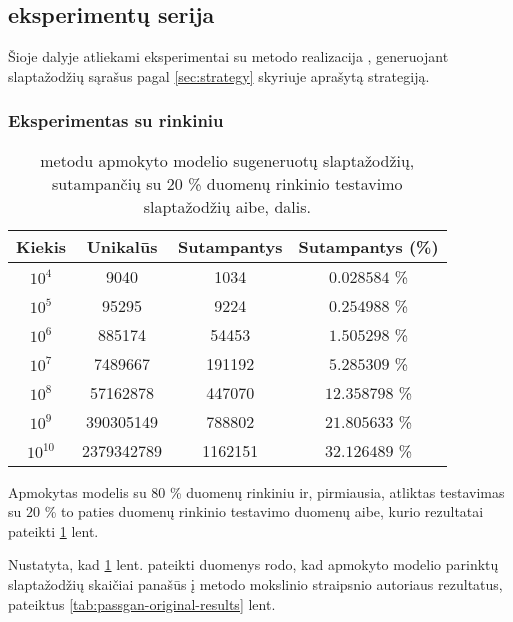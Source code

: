 \documentclass{VUMIFInfBakalaurinis}
\begin{document}
\subsection{ eksperimentų serija}
Šioje dalyje atliekami eksperimentai su  metodo realizacija 
\cite{PassGAN:impl}, generuojant slaptažodžių sąrašus pagal \ref{sec:strategy} 
skyriuje aprašytą strategiją.

\subsubsection{Eksperimentas su  rinkiniu} %
\label{sec:pgrockyou}
\begin{table}[hb]
  \centering
  \caption{%
     metodu apmokyto modelio sugeneruotų slaptažodžių, 
    sutampančių su $20$ \%  duomenų rinkinio testavimo
    slaptažodžių aibe, dalis.
  }
  \begin{tabular}{|c|c|c|c|}
    \hline \textbf{Kiekis} & \textbf{Unikalūs} & \textbf{Sutampantys} & 
    \textbf{Sutampantys (\%)} \\
    \hline $10^4$ & 9040 & 1034 & $0.028584$ \% \\
    \hline $10^5$ & 95295 & 9224 & $0.254988$ \% \\
    \hline $10^6$ & 885174 & 54453 & $1.505298$ \% \\
    \hline $10^7$ & 7489667 & 191192 & $5.285309$ \% \\
    \hline $10^8$ & 57162878 & 447070 & $12.358798$ \% \\
    \hline $10^9$ & 390305149 & 788802 & $21.805633$ \% \\
    \hline $10^{10}$ & 2379342789 & 1162151 & $32.126489$ \% \\
    \hline
  \end{tabular}
  \label{tab:passgan-rockyou-results}
\end{table}
Apmokytas modelis su $80$ \%  duomenų rinkiniu ir, 
pirmiausia, atliktas testavimas su $20$ \% to paties duomenų rinkinio testavimo 
duomenų aibe, kurio rezultatai pateikti \ref{tab:passgan-rockyou-results} lent.

Nustatyta, kad \ref{tab:passgan-rockyou-results} lent. pateikti duomenys rodo, 
kad apmokyto modelio parinktų slaptažodžių skaičiai panašūs į 
 metodo mokslinio straipsnio autoriaus rezultatus, pateiktus 
\ref{tab:passgan-original-results} lent.
\end{document}
